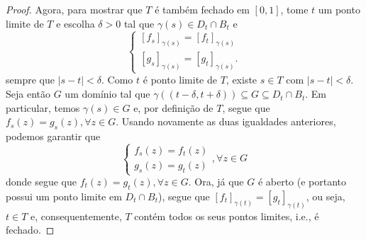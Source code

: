 \begin{proof}
        Agora, para mostrar que $T$ é também fechado em $[0,1]$, tome $t$ um ponto 
        limite de $T$ e escolha $\delta>0$ tal que $\gamma(s) \in D_t\cap B_t$ e
        \begin{equation*}
            \begin{cases}
                [f_s]_{\gamma(s)} = [f_t]_{\gamma(s)} \\
                [g_s]_{\gamma(s)} = [g_t]_{\gamma(s)}.
            \end{cases}
        \end{equation*}
        sempre que $|s-t|<\delta$. Como $t$ é ponto limite de $T$, existe $s\in T$ com
        $|s-t|<\delta$. Seja então $G$ um domínio tal que 
        $\gamma((t-\delta, t+\delta))\subseteq G\subseteq D_t\cap B_t$.
        Em particular, temos $\gamma(s)\in G$ e, por definição de $T$, segue que
        $f_s(z) = g_s(z), \forall z\in G$. Usando novamente as duas igualdades anteriores, 
        podemos garantir que
        \begin{equation*}
            \begin{cases}
                f_s(z) = f_t(z) \\
                g_s(z) = g_t(z)
            \end{cases}, \forall z\in G
        \end{equation*}
        donde segue que $f_t(z) = g_t(z), \forall z\in G$. Ora, já que $G$ é aberto 
        (e portanto possui um ponto limite em $D_t\cap B_t$), segue que 
        $[f_t]_{\gamma(t)} = [g_t]_{\gamma(t)}$, ou seja, $t\in T$ e, consequentemente,
        $T$ contém todos os seus pontos limites, i.e., é fechado.
    \end{proof}


